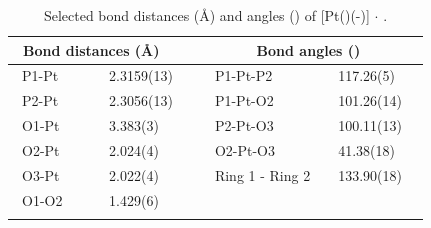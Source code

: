 \begin{table}[ht]
\caption[Selected bond distances (\AA) and angles (\degrees) of [Pt(\tButhixantphos)(-){]} $\cdot{}$ ]{Selected bond distances (\AA) and angles (\degrees) of [Pt(\tButhixantphos)(-){]} $\cdot{}$ .} 
\vspace{1em}
\label{table:crystalPtdioxygen:lengths}
\small
\begin{center}
\begin{tabular}{l l l l}
	\toprule
	\multicolumn{2}{l}{\bfseries{~Bond distances (\si{\angstrom})}} & \multicolumn{2}{c}{\bfseries{Bond angles (\degrees)}} \\
	\midrule		
	~P1-Pt		~~&~~2.3159(13)~~	&~~P1-Pt-P2			&~~117.26(5)~~	\\	
	~P2-Pt		~~&~~2.3056(13)~~	&~~P1-Pt-O2			&~~101.26(14)~~	\\
	~O1-Pt		~~&~~3.383(3)~~	&~~P2-Pt-O3			&~~100.11(13)~~	\\
	~O2-Pt		~~&~~2.024(4)~~	&~~O2-Pt-O3			&~~41.38(18)~~	\\
	~O3-Pt		~~&~~2.022(4)~~	&~~Ring 1 - Ring 2		&~~133.90(18)~~	\\
	~O1-O2		~~&~~1.429(6)~~	&~~					&~~		~~		\\
	\bottomrule{}
\end{tabular}
\end{center}
\end{table}

